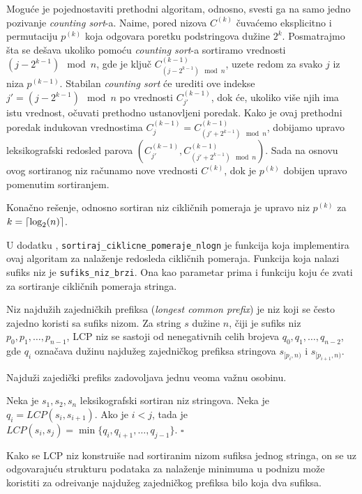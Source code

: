 Mogu\' ce je pojednostaviti prethodni algoritam, odnosno, svesti ga na samo jedno pozivanje \textit{counting sort}-a. Naime, pored nizova $C^{(k)}$ \v cuva\' cemo eksplicitno i permutaciju $p^{(k)}$ koja odgovara poretku podstringova du\v zine $2^k$. Posmatrajmo \v sta se de\v sava ukoliko pomo\' cu \textit{counting sort}-a sortiramo vrednosti $(j - 2^{k-1}) \mod n$, gde je klju\v c $C^{(k-1)}_{(j - 2^{k-1}) \mod n}$, uzete redom za svako $j$ iz niza $p^{(k-1)}$. Stabilan \textit{counting sort} \' ce urediti ove indekse $j' = (j - 2^{k-1}) \mod n$ po vrednosti $C^{(k-1)}_{j'}$, dok \' ce, ukoliko vi\v se njih ima istu vrednost, o\v cuvati prethodno ustanovljeni poredak. Kako je ovaj prethodni poredak indukovan vrednostima $C^{(k-1)}_j = C^{(k-1)}_{(j' + 2^{k-1}) \mod n}$, dobijamo upravo leksikografski redosled parova $(C^{(k-1)}_{j'}, C^{(k-1)}_{(j' + 2^{k-1}) \mod n})$. Sada na osnovu ovog sortiranog niz ra\v cunamo nove vrednosti $C^{(k)}$, dok je $p^{(k)}$ dobijen upravo pomenutim sortiranjem.

Kona\v cno re\v senje, odnosno sortiran niz cikli\v cnih pomeraja je upravo niz $p^{(k)}$ za $k = \left \lceil \log_2(n) \right \rceil$.

U dodatku \sirdodatak, \texttt{sortiraj\_ciklicne\_pomeraje\_nlogn} je funkcija koja implementira ovaj algoritam za nala\v zenje redosleda cikli\v cnih pomeraja. Funkcija koja nalazi sufiks niz je \texttt{sufiks\_niz\_brzi}. Ona kao parametar prima i funkciju koju \' ce zvati za sortiranje cikli\v cnih pomeraja stringa.


Niz najdu\v zih zajedni\v ckih prefiksa (\textit{longest common prefix}) je niz koji se \v cesto zajedno koristi sa sufiks nizom. Za string $s$ du\v zine $n$, \v ciji je sufiks niz $p_0, p_1, \ldots, p_{n-1}$, LCP niz se sastoji od nenegativnih celih brojeva $q_0, q_1, \ldots, q_{n-2}$, gde $q_i$ ozna\v cava du\v zinu najdu\v zeg zajedni\v ckog prefiksa stringova $s_{[p_i, n)}$ i $s_{[p_{i+1}, n)}$.

Najdu\v zi zajedi\v cki prefiks zadovoljava jednu veoma va\v znu osobinu.

\begin{thm}
\label{lcposobina}
Neka je $s_1, s_2, s_n$ leksikografski sortiran niz stringova. Neka je $q_i = LCP(s_i, s_{i+1})$. Ako je $i<j$, tada je $LCP(s_i, s_j) = \min\{q_i, q_{i+1}, \ldots, q_{j-1}\}$. \hfill $\square$
\end{thm}

Kako se LCP niz konstrui\v se nad sortiranim nizom sufiksa jednog stringa, on se uz odgovaraju\' cu strukturu podataka za nala\v zenje minimuma u podnizu mo\v ze koristiti za odre\dj ivanje najdu\v zeg zajedni\v ckog prefiksa bilo koja dva sufiksa.

